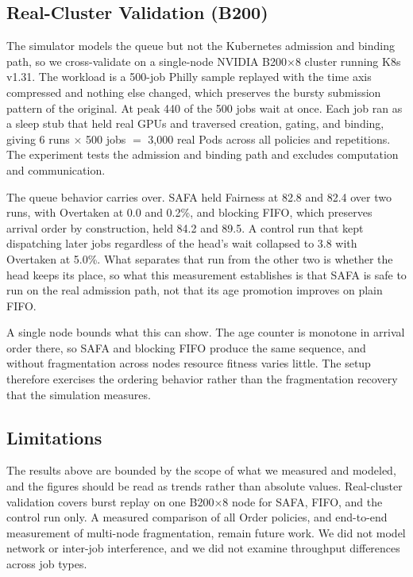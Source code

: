 \documentclass{ieeetj}
\begin{document}
\subsection{Real-Cluster Validation (B200)}\label{eval:b200}
The simulator models the queue but not the Kubernetes admission and binding path, so we cross-validate on a single-node NVIDIA B200$\times$8 cluster running K8s v1.31. The workload is a 500-job Philly sample replayed with the time axis compressed and nothing else changed, which preserves the bursty submission pattern of the original. At peak 440 of the 500 jobs wait at once. Each job ran as a sleep stub that held real GPUs and traversed creation, gating, and binding, giving 6 runs $\times$ 500 jobs $=$ 3{,}000 real Pods across all policies and repetitions. The experiment tests the admission and binding path and excludes computation and communication.

The queue behavior carries over. SAFA held Fairness at 82.8 and 82.4 over two runs, with Overtaken at 0.0 and 0.2\%, and blocking FIFO, which preserves arrival order by construction, held 84.2 and 89.5. A control run that kept dispatching later jobs regardless of the head's wait collapsed to 3.8 with Overtaken at 5.0\%. What separates that run from the other two is whether the head keeps its place, so what this measurement establishes is that SAFA is safe to run on the real admission path, not that its age promotion improves on plain FIFO.

A single node bounds what this can show. The age counter is monotone in arrival order there, so SAFA and blocking FIFO produce the same sequence, and without fragmentation across nodes resource fitness varies little. The setup therefore exercises the ordering behavior rather than the fragmentation recovery that the simulation measures.

\subsection{Limitations}\label{eval:threats}
The results above are bounded by the scope of what we measured and modeled, and the figures should be read as trends rather than absolute values. Real-cluster validation covers burst replay on one B200$\times$8 node for SAFA, FIFO, and the control run only. A measured comparison of all Order policies, and end-to-end measurement of multi-node fragmentation, remain future work. We did not model network or inter-job interference, and we did not examine throughput differences across job types.
\end{document}
